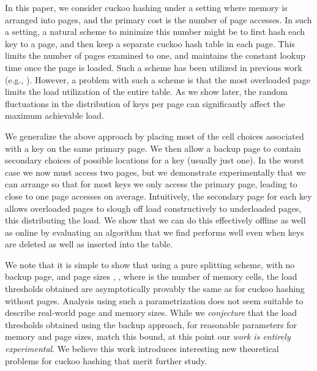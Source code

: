 \let\accentvec\vec \documentclass{llncs}
\newcommand{\eg}{e.g.}
\begin{document}
In this paper, we consider cuckoo hashing under a setting where memory
is arranged into pages, and the primary cost is the number of
page accesses.  In such a setting, a natural scheme to minimize this
number might be to first hash each key to a page, and
then keep a separate cuckoo hash table in each page.  This limits the
number of pages examined to one, and maintains the constant lookup
time once the page is loaded.  Such a scheme has been utilized in
previous work (\eg, \cite{alcantara2009real}).  However, a problem
with such a scheme is that the most overloaded page limits the load
utilization of the entire table.  As we show later, the random
fluctuations in the distribution of keys per page can significantly
affect the maximum achievable load.

We generalize the above approach by placing most of the cell choices
associated with a key on the same primary page.  We then allow a
backup page to contain secondary choices of possible locations for a
key (usually just one).  In the worst case we now must access two
pages, but we demonstrate experimentally that we can arrange so that
for most keys we only access the primary page, leading to close to one page
accesses on average.  Intuitively, the secondary page for each key
allows overloaded pages to slough off load constructively to
underloaded pages, this distributing the load.  We show that we
can do this effectively offline as well as online by evaluating an
algorithm that we find performs well even when keys are deleted as
well as inserted into the table.

We note that it is simple to show that using a pure splitting scheme,
with no backup page, and page sizes , , where
 is the number of memory cells, the load thresholds obtained are
asymptotically provably the same as for cuckoo hashing without pages.
Analysis using such a parametrization does not seem suitable to
describe real-world page and memory sizes.  While we \emph{conjecture}
that the load thresholds obtained using the backup approach, for
reasonable parameters for memory and page sizes, match this bound, at
this point our \emph{work is entirely experimental}.  We believe this
work introduces interesting new theoretical problems for cuckoo
hashing that merit further study.
\end{document}
